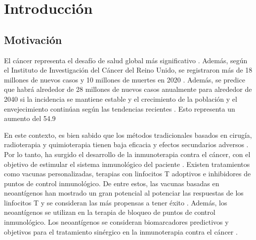 \chapter{Introducción}
\label{cap:introduccion}


\section{Motivación}
\label{sec:motivacion}

El cáncer representa el desafío de salud global más significativo \cite{siegel2023cancer}. Además, según el Instituto de Investigación del Cáncer del Reino Unido, se registraron más de 18 millones de nuevos casos y 10 millones de muertes en 2020 \cite{cancerUK2023}. Además, se predice que habrá alrededor de 28 millones de nuevos casos anualmente para alrededor de 2040 si la incidencia se mantiene estable y el crecimiento de la población y el envejecimiento continúan según las tendencias recientes \cite{cancerUK2023_2}. Esto representa un aumento del 54.9%

En este contexto, es bien sabido que los métodos tradicionales basados en cirugía, radioterapia y quimioterapia tienen baja eficacia y efectos secundarios adversos \cite{peng2019neoantigen}. Por lo tanto, ha surgido el desarrollo de la inmunoterapia contra el cáncer, con el objetivo de estimular el sistema inmunológico del paciente \cite{borden2022cancer}. Existen tratamientos como vacunas personalizadas, terapias con linfocitos T adoptivos e inhibidores de puntos de control inmunológico. De entre estos, las vacunas basadas en neoantígenos han mostrado un gran potencial al potenciar las respuestas de los linfocitos T y se consideran las más propensas a tener éxito \cite{borden2022cancer}. Además, los neoantígenos se utilizan en la terapia de bloqueo de puntos de control inmunológico. Los neoantígenos se consideran biomarcadores predictivos y objetivos para el tratamiento sinérgico en la inmunoterapia contra el cáncer \cite{fang2022neoantigens}.

